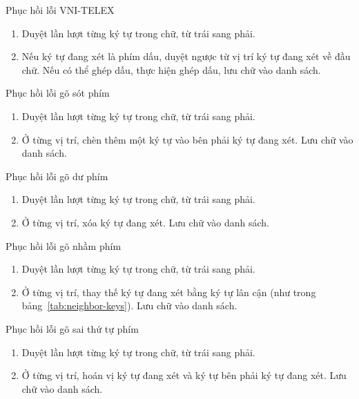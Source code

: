 \documentclass[a4paper,oneside,14pt]{extbook} %
\begin{document}
\begin{algo}\caption{Phục hồi lỗi VNI-TELEX}
  \begin{enumerate}
  \item Duyệt lần lượt từng ký tự trong chữ, từ trái sang phải.
  \item Nếu ký tự đang xét là phím dấu, duyệt ngược từ vị trí ký tự
    đang xét về đầu chữ. Nếu có thể ghép dấu, thực hiện ghép dấu, lưu
    chữ vào danh sách. 
  \end{enumerate}
\end{algo}

\begin{algo}\caption{Phục hồi lỗi gõ sót phím}
  \begin{enumerate}
  \item Duyệt lần lượt từng ký tự trong chữ, từ trái sang phải.
  \item Ở từng vị trí, chèn thêm một ký tự vào bên phải ký tự đang
    xét. Lưu chữ vào danh sách.
  \end{enumerate}
\end{algo}

\begin{algo}\caption{Phục hồi lỗi gõ dư phím}
  \begin{enumerate}
  \item Duyệt lần lượt từng ký tự trong chữ, từ trái sang phải.
  \item Ở từng vị trí, xóa ký tự đang xét. Lưu chữ vào danh sách.
  \end{enumerate}
\end{algo}

\begin{algo}\caption{Phục hồi lỗi gõ nhầm phím}
  \begin{enumerate}
  \item Duyệt lần lượt từng ký tự trong chữ, từ trái sang phải.
  \item Ở từng vị trí, thay thế ký tự đang xét bằng ký tự lân cận (như
    trong bảng~\ref{tab:neighbor-keys}). Lưu chữ vào danh sách.
  \end{enumerate}
\end{algo}

\begin{algo}\caption{Phục hồi lỗi gõ sai thứ tự phím}
  \begin{enumerate}
  \item Duyệt lần lượt từng ký tự trong chữ, từ trái sang phải.
  \item Ở từng vị trí, hoán vị ký tự đang xét và ký tự bên phải ký tự
    đang xét. Lưu chữ vào danh sách.
  \end{enumerate}
\end{algo}
\end{document}

